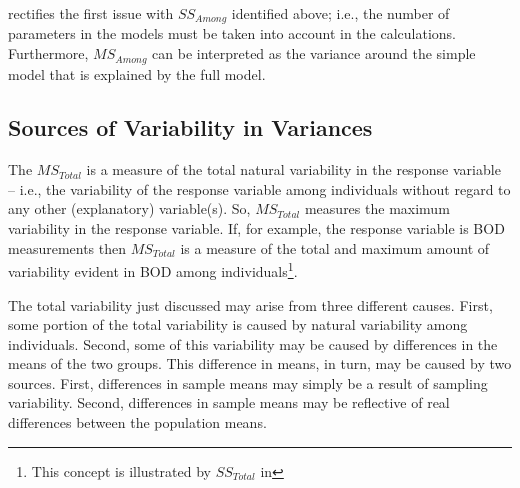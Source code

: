 \documentclass[10pt,openany]{book}\usepackage[]{graphicx}\usepackage[]{color}
\begin{document}
rectifies the first issue with $SS_{Among}$ identified above; i.e., the number of parameters in the models must be taken into account in the calculations.  Furthermore, $MS_{Among}$ can be interpreted as the variance around the simple model that is explained by the full model.


\subsection*{Sources of Variability in Variances}
The $MS_{Total}$ is a measure of the total natural variability in the response variable -- i.e., the variability of the response variable among individuals without regard to any other (explanatory) variable(s).  So, $MS_{Total}$ measures the maximum variability in the response variable.  If, for example, the response variable is BOD measurements then $MS_{Total}$ is a measure of the total and maximum amount of variability evident in BOD among individuals\footnote{This concept is illustrated by $SS_{Total}$ in }.


The total variability just discussed may arise from three different causes.  First, some portion of the total variability is caused by natural variability among individuals.  Second, some of this variability may be caused by differences in the means of the two groups.  This difference in means, in turn, may be caused by two sources.  First, differences in sample means may simply be a result of sampling variability.  Second, differences in sample means may be reflective of real differences between the population means.

\end{document}
